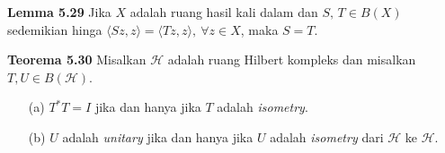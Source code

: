 \documentclass{article}
\begin{document}
\begin{multicols}{2}
  \textbf{Lemma 5.29} Jika \(X\) adalah ruang hasil kali dalam dan \(S,\,T\in B(X)\) sedemikian hinga \(\langle Sz, z\rangle = \langle Tz, z\rangle,\:\forall z \in X\), maka \(S=T\).

  \textbf{Teorema 5.30} Misalkan \(\mathcal{H}\) adalah ruang Hilbert kompleks dan misalkan \(T,U\in B(\mathcal{H})\).
  \begin{itemize}
    \item[(a)] \(T^*T = I\) jika dan hanya jika \(T\) adalah \textit{isometry}.
    \item[(b)] \(U\) adalah \textit{unitary} jika dan hanya jika \(U\) adalah \textit{isometry} dari \(\mathcal{H}\) ke \(\mathcal{H}\).
  \end{itemize}

\end{multicols}
\end{document}
